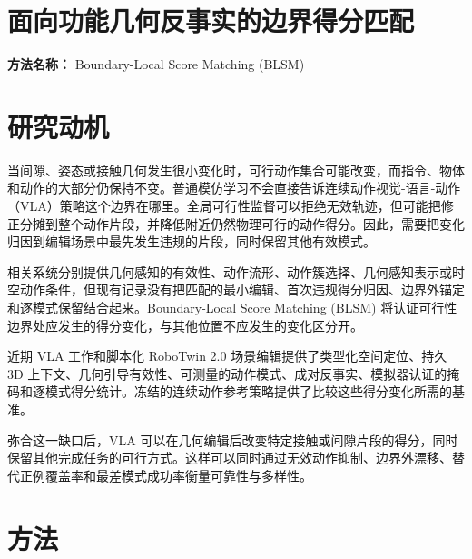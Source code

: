 \documentclass[10pt,a4paper]{article}
\begin{document}
\section*{面向功能几何反事实的边界得分匹配}
\textbf{方法名称：} Boundary-Local Score Matching (BLSM)
\section*{研究动机}
当间隙、姿态或接触几何发生很小变化时，可行动作集合可能改变，而指令、物体和动作的大部分仍保持不变。普通模仿学习不会直接告诉连续动作视觉-语言-动作（VLA）策略这个边界在哪里。全局可行性监督可以拒绝无效轨迹，但可能把修正分摊到整个动作片段，并降低附近仍然物理可行的动作得分。因此，需要把变化归因到编辑场景中最先发生违规的片段，同时保留其他有效模式。

相关系统分别提供几何感知的有效性、动作流形、动作簇选择、几何感知表示或时空动作条件，但现有记录没有把匹配的最小编辑、首次违规得分归因、边界外锚定和逐模式保留结合起来。Boundary-Local Score Matching (BLSM) 将认证可行性边界处应发生的得分变化，与其他位置不应发生的变化区分开。

近期 VLA 工作和脚本化 RoboTwin 2.0 场景编辑提供了类型化空间定位、持久 3D 上下文、几何引导有效性、可测量的动作模式、成对反事实、模拟器认证的掩码和逐模式得分统计。冻结的连续动作参考策略提供了比较这些得分变化所需的基准。

弥合这一缺口后，VLA 可以在几何编辑后改变特定接触或间隙片段的得分，同时保留其他完成任务的可行方式。这样可以同时通过无效动作抑制、边界外漂移、替代正例覆盖率和最差模式成功率衡量可靠性与多样性。
\section*{方法}
\end{document}
